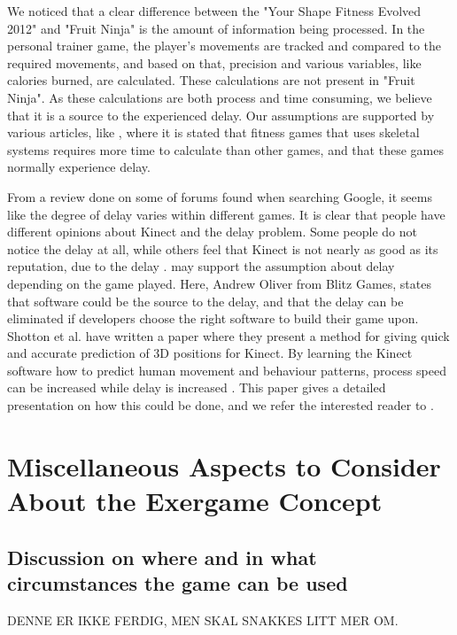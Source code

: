 We noticed that a clear difference between the "Your Shape Fitness Evolved 2012" and "Fruit Ninja" is the amount of information being processed. In the personal trainer game, the player's movements are tracked and compared to the required movements, and based on that, precision and various variables, like calories burned, are calculated. These calculations are not present in "Fruit Ninja". As these calculations are both process and time consuming, we believe that it is a source to the experienced delay. Our assumptions are supported by various articles, like \cite{kinectLag}, where it is stated that fitness games that uses skeletal systems requires more time to calculate than other games, and that these games normally experience delay. 

From a review done on some of forums found when searching Google, it seems like the degree of delay varies within different games. It is clear that people have different opinions about Kinect and the delay problem. Some people do not notice the delay at all, while others feel that Kinect is not nearly as good as its reputation, due to the delay \cite{kinectLagForum1} \cite{kinectLagForum2}. \cite{kinectLag} may support the assumption about delay depending on the game played. Here, Andrew Oliver from Blitz Games, states that software could be the source to the delay, and that the delay can be eliminated if developers choose the right software to build their game upon. Shotton et al. have written a paper where they present a method for giving quick and accurate prediction of 3D positions for Kinect. By learning the Kinect software how to predict human movement and behaviour patterns, process speed can be increased while delay is increased \cite{artikkelKinectLag} \cite{artikkelKinectLagIntro}. This paper gives a detailed presentation on how this could be done, and we refer the interested reader to \cite{artikkelKinectLag}.       

\section{Miscellaneous Aspects to Consider About the Exergame Concept}
\label{sec:misc}

\subsection{Discussion on where and in what circumstances the game can be used}
DENNE ER IKKE FERDIG, MEN SKAL SNAKKES LITT MER OM.
\label{subsec:whatwhere}

